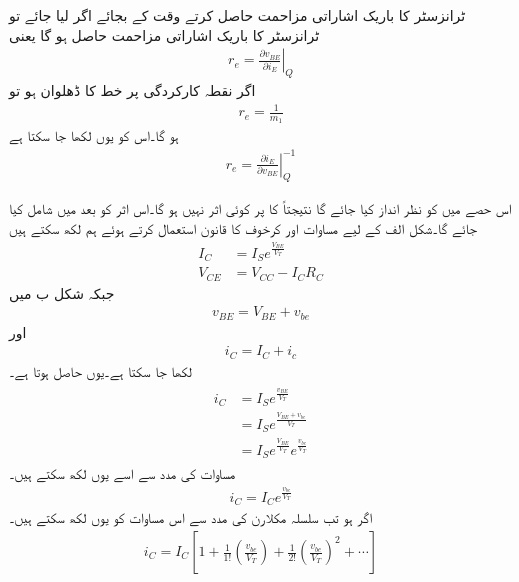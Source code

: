 ٹرانزسٹر  کا باریک اشاراتی مزاحمت حاصل کرتے وقت  کے بجائے اگر  لیا جائے تو ٹرانزسٹر کا باریک اشاراتی مزاحمت  حاصل ہو گا یعنی
\begin{align}
r_e = \left . \frac{\partial v_{BE}}{\partial i_E}\right |_Q
\end{align}
اگر نقطہ کارکردگی پر  خط کا ڈھلوان  ہو تو 
\begin{align}
r_e =\frac{1}{m_1}
\end{align}
ہو گا۔اس کو یوں لکھا جا سکتا ہے
\begin{align}
r_e =\left. \frac{\partial i_E}{\partial v_{BE}} \right |_Q^{-1}
\end{align}

اس حصے میں    کو نظر انداز کیا جائے گا نتیجتاً   کا  پر کوئی اثر نہیں ہو گا۔اس اثر کو بعد میں شامل کیا جائے گا۔شکل   الف کے لیے مساوات  اور کرخوف کا قانون استعمال کرتے ہوئے ہم لکھ سکتے ہیں
\begin{align}
I_C&=I_S e^{\frac{V_{BE}}{V_T}} \label{مساوات_ٹرانزسٹر_یک_سمتی_رو_الف}\\
V_{CE}&=V_{CC}-I_C R_C \label{مساوات_ٹرانزسٹر_یک_سمتی_دباو_الف}
\end{align}
جبکہ شکل  ب میں
\begin{align} \label{مساوات_ٹرانزسٹر_داخلی_دباو_کے_یکسمتی_اور_بدلتا_حصے}
v_{BE}=V_{BE}+v_{be}
\end{align}
اور
\begin{align} \label{مساوات_ٹرانزسٹر_رو_کے_یکسمتی_اور_بدلتا_حصے}
i_C=I_C+i_c
\end{align}
لکھا جا سکتا ہے۔یوں حاصل ہوتا ہے۔
\begin{gather}
\begin{aligned}
i_C&=I_S e^{\frac{v_{BE}}{V_T}}\\
&=I_S e^{\frac{V_{BE}+v_{be}}{V_T}}\\
&=I_S e^{\frac{V_{BE}}{V_T}} e^{\frac{v_{be}}{V_T}}
\end{aligned}
\end{gather}
مساوات   کی مدد سے اسے یوں لکھ سکتے ہیں۔
\begin{align}
i_C = I_C e^{\frac{v_{be}}{V_T}}
\end{align}
اگر   ہو تب سلسلہ مکلارن  کی مدد سے اس مساوات کو یوں لکھ سکتے ہیں۔
\begin{align} \label{مساوات_ٹرانزسٹر_سلسلہ+مکلارن}
i_C=I_C \left [1+\frac{1}{1!} \left(\frac{v_{be}}{V_T} \right )+\frac{1}{2!} \left(\frac{v_{be}}{V_T} \right)^2+ \cdots \right ]
\end{align}
